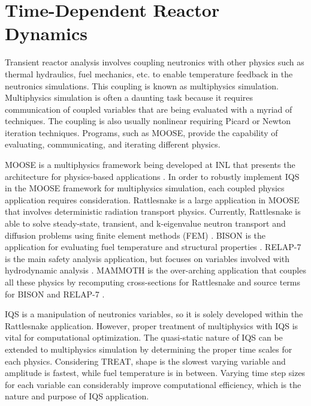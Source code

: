 \section{Time-Dependent Reactor Dynamics}

Transient reactor analysis  involves coupling neutronics with other physics such as thermal hydraulics, fuel mechanics, etc. to enable temperature feedback in the neutronics simulations. This coupling is known as multiphysics simulation. Multiphysics simulation is often a daunting task because it requires communication of coupled variables that are being evaluated with a myriad of techniques. The coupling is also usually nonlinear requiring Picard or Newton iteration techniques. Programs, such as MOOSE, provide the capability of evaluating, communicating, and iterating different physics. 

MOOSE is a multiphysics framework being developed at INL that presents the architecture for physics-based applications \cite{moose}.  In order to robustly implement IQS in the MOOSE framework for multiphysics simulation, each coupled physics application requires consideration. Rattlesnake is a large application in MOOSE that involves deterministic radiation transport physics.  Currently, Rattlesnake is able to solve steady-state, transient, and k-eigenvalue neutron transport and diffusion problems using finite element methods (FEM) \cite{wang2013}. BISON is the application for evaluating fuel temperature and structural properties \cite{bison}.  RELAP-7 is the main safety analysis application, but focuses on variables involved with hydrodynamic analysis \cite{relap7}.  MAMMOTH is the over-arching application that couples all these physics by recomputing cross-sections for Rattlesnake and source terms for BISON and RELAP-7 \cite{mammoth}.

IQS is a manipulation of neutronics variables, so it is solely developed within the Rattlesnake application. However, proper treatment of multiphysics with IQS is vital for computational optimization.  The quasi-static nature of IQS can be extended to multiphysics simulation by determining the proper time scales for each physics.  Considering TREAT, shape is the slowest varying variable and amplitude is fastest, while fuel temperature is in between.  Varying time step sizes for each variable can considerably improve computational efficiency, which is the nature and purpose of IQS application.

